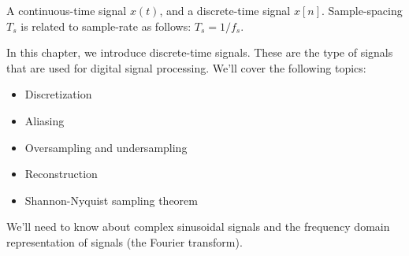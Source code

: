 \begin{marginfigure}
\begin{center}
\end{center}
\caption{A continuous-time signal $x(t)$, and a discrete-time signal
  $x[n]$. Sample-spacing $T_s$ is related to sample-rate as follows:
  $T_s = 1/f_s$.}

\end{marginfigure}
In this chapter, we introduce discrete-time signals. These are the
type of signals that are used for digital signal processing. We'll
cover the following topics:
\begin{itemize}
\item Discretization 
\item Aliasing
\item Oversampling and undersampling
\item Reconstruction
\item Shannon-Nyquist sampling theorem
\end{itemize}
We'll need to know about complex sinusoidal signals and the frequency
domain representation of signals (the Fourier transform).

